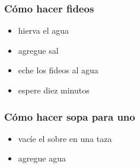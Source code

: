 \documentclass{beamer}
\begin{document}
\begin{frame}
    \frametitle{Cómo hacer fideos}
    \begin{itemize}
        \item hierva el agua
        \item agregue sal
        \item eche los fideos al agua
        \item espere diez minutos
    \end{itemize}
\end{frame}

\begin{frame}
    \frametitle{Cómo hacer sopa para uno}
    \begin{itemize}
        \item vacíe el sobre en una taza
        \item agregue agua
    \end{itemize}
\end{frame}
\end{document}
